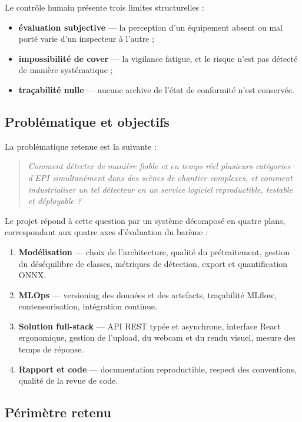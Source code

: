 \documentclass[11pt,a4paper]{article}
\begin{document}
Le contrôle humain présente trois limites structurelles :
\begin{itemize}[leftmargin=1.2em]
  \item \textbf{évaluation subjective} --- la perception d'un équipement
        absent ou mal porté varie d'un inspecteur à l'autre ;
  \item \textbf{impossibilité de cover} --- la vigilance fatigue, et le
        risque n'est pas détecté de manière systématique ;
  \item \textbf{traçabilité nulle} --- aucune archive de l'état de
        conformité n'est conservée.
\end{itemize}

\subsection{Problématique et objectifs}

La problématique retenue est la suivante :

\begin{quote}
\textit{Comment détecter de manière fiable et en temps réel plusieurs
catégories d'EPI simultanément dans des scènes de chantier complexes, et
comment industrialiser un tel détecteur en un service logiciel
reproductible, testable et déployable ?}
\end{quote}

Le projet répond à cette question par un système décomposé en quatre
plans, correspondant aux quatre axes d'évaluation du barème :

\begin{enumerate}[leftmargin=1.4em]
  \item \textbf{Modélisation} --- choix de l'architecture, qualité du
        prétraitement, gestion du déséquilibre de classes, métriques de
        détection, export et quantification ONNX.
  \item \textbf{MLOps} --- versioning des données et des artefacts,
        traçabilité MLflow, conteneurisation, intégration continue.
  \item \textbf{Solution full-stack} --- API REST typée et asynchrone,
        interface React ergonomique, gestion de l'upload, du webcam et du
        rendu visuel, mesure des temps de réponse.
  \item \textbf{Rapport et code} --- documentation reproductible, respect
        des conventions, qualité de la revue de code.
\end{enumerate}

\subsection{Périmètre retenu}
\end{document}

